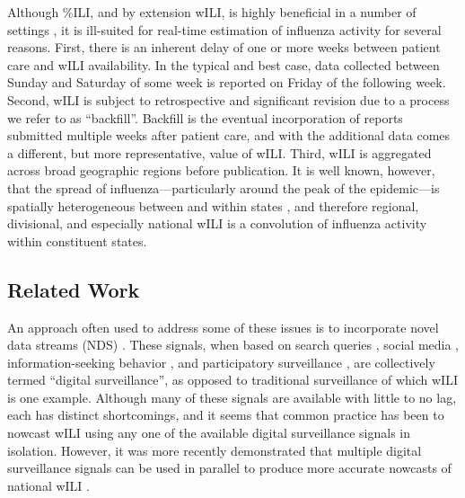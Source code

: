 \documentclass[10pt,letterpaper]{article}
\begin{document}
Although \%ILI, and by extension wILI, is highly beneficial in a number of
settings \cite{ritzwoller2005comparison, thompson2006epidemiology,
m2008infectious}, it is ill-suited for real-time estimation of influenza
activity for several reasons. First, there is an inherent delay of one or more
weeks between patient care and wILI availability. In the typical and best case,
data collected between Sunday and Saturday of some week is reported on Friday
of the following week. Second, wILI is subject to retrospective and significant
revision due to a process we refer to as ``backfill''. Backfill is the eventual
incorporation of reports submitted multiple weeks after patient care, and with
the additional data comes a different, but more representative, value of wILI.
Third, wILI is aggregated across broad geographic regions before publication.
It is well known, however, that the spread of influenza---particularly around
the peak of the epidemic---is spatially heterogeneous between and within states
\cite{bonabeau1998geographical, viboud2006synchrony, eggo2010spatial,
viboud2013contrasting, gog2014spatial}, and therefore regional, divisional, and
especially national wILI is a convolution of influenza activity within
constituent states.

\subsection*{Related Work}

An approach often used to address some of these issues is to incorporate novel
data streams (NDS) \cite{althouse2015enhancing}. These signals, when based on
search queries \cite{eysenbach2006infodemiology, polgreen2008using,
hulth2009web, ginsberg2009, dugas2013, araz2014using, santillana2014can,
preis2014adaptive}, social media \cite{ritterman2009, culotta2010towards,
signorini2011use, achrekar2011predicting, broniatowski2013national,
paul2014twitter}, information-seeking behavior \cite{generous2014global,
mciver2014wikipedia, hickmann2015forecasting}, and participatory surveillance
\cite{smolinski2015flu, chunara2013flu}, are collectively termed ``digital
surveillance'', as opposed to traditional surveillance of which wILI is one
example. Although many of these signals are available with little to no lag,
each has distinct shortcomings, and it seems that common practice has been to
nowcast wILI using any one of the available digital surveillance signals in
isolation. However, it was more recently demonstrated that multiple digital
surveillance signals can be used in parallel to produce more accurate nowcasts
of national wILI \cite{santillana2015combining}.
\end{document}
